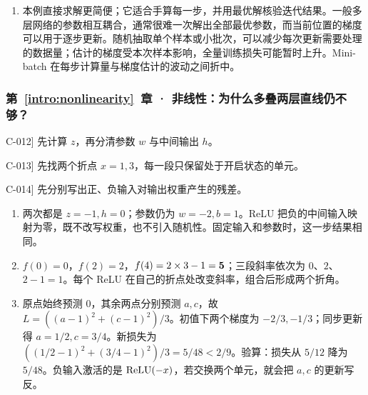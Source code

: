\begin{enumerate}[label={},leftmargin=4.8em,itemsep=4pt]
\item[\textbf{\hyperref[exercise:iterative-method-choice]{C-011.}}] \leavevmode{}\label{solution:C-011}\label{solution:iterative-method-choice}本例直接求解更简便；它适合手算每一步，并用最优解核验迭代结果。一般多层网络的参数相互耦合，通常很难一次解出全部最优参数，而当前位置的梯度可以用于逐步更新。随机抽取单个样本或小批次，可以减少每次更新需要处理的数据量；估计的梯度受本次样本影响，全量训练损失可能暂时上升。Mini-batch 在每步计算量与梯度估计的波动之间折中。
\end{enumerate}
\subsubsection*{第~\ref*{intro:nonlinearity}~章 · 非线性：为什么多叠两层直线仍不够？}
\begin{answerhints}
\item[\hyperref[exercise:relu-determinism]{C-012}] \leavevmode{}\label{hint:relu-determinism}先计算 $z$，再分清参数 $w$ 与中间输出 $h$。
\item[\hyperref[exercise:relu-piecewise-slopes]{C-013}] \leavevmode{}\label{hint:relu-piecewise-slopes}先找两个折点 $x=1,3$，每一段只保留处于开启状态的单元。
\item[\hyperref[exercise:relu-output-weight-update]{C-014}] \leavevmode{}\label{hint:relu-output-weight-update}先分别写出正、负输入对输出权重产生的残差。
\end{answerhints}
\begin{enumerate}[label={},leftmargin=4.8em,itemsep=4pt]
\item[\textbf{\hyperref[exercise:relu-determinism]{C-012.}}] \leavevmode{}\label{solution:C-012}\label{solution:relu-determinism}两次都是 $z=-1,h=0$；参数仍为 $w=-2,b=1$。ReLU 把负的中间输入映射为零，既不改写权重，也不引入随机性。固定输入和参数时，这一步结果相同。
\item[\textbf{\hyperref[exercise:relu-piecewise-slopes]{C-013.}}] \leavevmode{}\label{solution:C-013}\label{solution:relu-piecewise-slopes}$f(0)=0$，$f(2)=2$，$f(4)=2\times3-1=\boldsymbol{5}$；三段斜率依次为 $0$、$2$、$2-1=1$。每个 ReLU 在自己的折点处改变斜率，组合后形成两个折角。
\item[\textbf{\hyperref[exercise:relu-output-weight-update]{C-014.}}] \leavevmode{}\label{solution:C-014}\label{solution:relu-output-weight-update}原点始终预测 $0$，其余两点分别预测 $a,c$，故 $L=((a-1)^2+(c-1)^2)/3$。初值下两个梯度为 $-2/3,-1/3$；同步更新得 $a=1/2,c=3/4$。新损失为 $((1/2-1)^2+(3/4-1)^2)/3=5/48<2/9$。验算：损失从 $5/12$ 降为 $5/48$。负输入激活的是 $\operatorname{ReLU}(-x)$，若交换两个单元，就会把 $a,c$ 的更新写反。
\end{enumerate}
